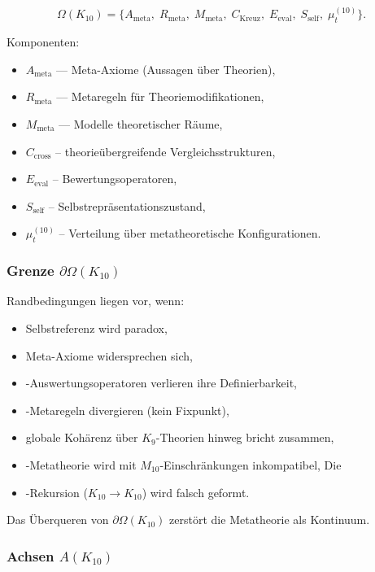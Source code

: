 \[
\Omega(K_{10})=
\{
A_{\mathrm{meta}},\;
R_{\mathrm{meta}},\;
M_{\mathrm{meta}},\;
C_{\mathrm{Kreuz}},\;
E_{\mathrm{eval}},\;
S_{\mathrm{self}},\;
\mu^{(10)}_t
\}.
\]

Komponenten:
\begin{itemize}
    \item $A_{\mathrm{meta}}$ — Meta-Axiome (Aussagen über Theorien),
    \item $R_{\mathrm{meta}}$ — Metaregeln für Theoriemodifikationen,
    \item $M_{\mathrm{meta}}$ — Modelle theoretischer Räume,
    \item $C_{\mathrm{cross}}$ – theorieübergreifende Vergleichsstrukturen,
    \item $E_{\mathrm{eval}}$ – Bewertungsoperatoren,
    \item $S_{\mathrm{self}}$ – Selbstrepräsentationszustand,
    \item $\mu^{(10)}_t$ – Verteilung über metatheoretische Konfigurationen.
\end{itemize}

\subsubsection{Grenze $\partial\Omega(K_{10})$}

Randbedingungen liegen vor, wenn:
\begin{itemize}
    \item Selbstreferenz wird paradox,
    \item Meta-Axiome widersprechen sich,
    \item-Auswertungsoperatoren verlieren ihre Definierbarkeit,
    \item-Metaregeln divergieren (kein Fixpunkt),
    \item globale Kohärenz über $K_9$-Theorien hinweg bricht zusammen,
    \item-Metatheorie wird mit $M_{10}$-Einschränkungen inkompatibel,
    Die \item-Rekursion ($K_{10}\to K_{10}$) wird falsch geformt.
\end{itemize}

Das Überqueren von $\partial\Omega(K_{10})$ zerstört die Metatheorie als Kontinuum.

\subsubsection{Achsen $A(K_{10})$}

